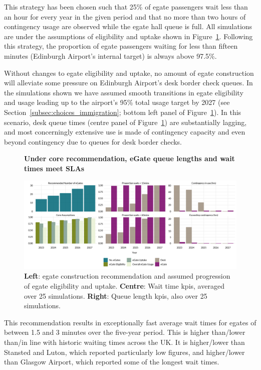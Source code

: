 \documentclass[10pt]{article}
\newcommand*{\figuretitle}[1]{%
    {\centering%
    \textbf{#1}%
    \par\medskip}%
}
\begin{document}
This strategy has been chosen such that 25\% of \gls{egate} passengers wait less than an hour for every year in the given period and that no more than two hours of contingency usage are observed while the \gls{egate} hall queue is full. All simulations are under the assumptions of eligibility and uptake shown in Figure~\ref{fig:core_rec_fig}. Following this strategy, the proportion of \gls{egate} passengers waiting for less than fifteen minutes (Edinburgh Airport's internal target) is always above 97.5\%. 

Without changes to \gls{egate} eligibility and uptake, no amount of \gls{egate} construction will alleviate some pressure on Edinburgh Airport's desk border check queues. In the simulations shown we have assumed smooth transitions in \gls{egate} eligibility and usage leading up to the airport's 95\% total usage target by 2027 (see Section~\ref{subsec:choices_immigration}; bottom left panel of Figure~\ref{fig:core_rec_fig}). In this scenario, desk queue times (centre panel of Figure~\ref{fig:core_rec_fig}) are substantially lagging, and most concerningly extensive use is made of contingency capacity and even beyond contingency due to queues for desk border checks. 

\begin{figure}[!ht]
    \centering
    \figuretitle{Under core recommendation, eGate queue lengths and wait times meet SLAs}
    \includegraphics[width=\textwidth]{figures/core_rec_fig.png}
     \caption{\textbf{Left}: \gls{egate} construction recommendation and assumed progression of \gls{egate} eligibility and uptake. \textbf{Centre}: Wait time \glspl{kpi}, averaged over 25 simulations. \textbf{Right}: Queue length \glspl{kpi}, also over 25 simulations.} \label{fig:core_rec_fig}
\end{figure}

This recommendation results in exceptionally fast average wait times for \glspl{egate} of between 1.5 and 3 minutes over the five-year period. This is higher than/lower than/in line with historic waiting times across the UK. It is higher/lower than Stansted and Luton, which reported particularly low figures, and higher/lower than Glasgow Airport, which reported some of the longest wait times. 
\end{document}
